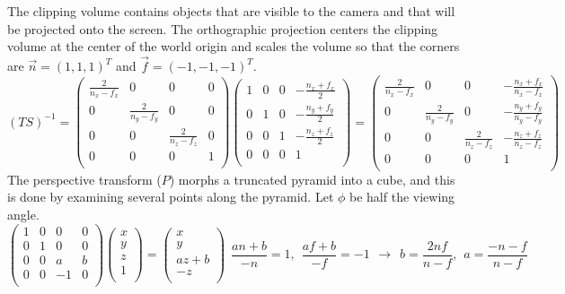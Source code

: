 \documentclass[10pt]{article}
\begin{document}
The clipping volume contains objects that are visible to the camera and that will be projected onto the screen. The orthographic projection centers the clipping volume at the center of the world origin and scales the volume so that the corners are $ \vec{n} = (1, 1, 1)^T $ and $ \vec{f} = (-1, -1, -1)^T $.
\[(TS)^{-1} = \begin{pmatrix}
\frac{2}{n_x-f_x} & 0 & 0 & 0 \\
0 & \frac{2}{n_y-f_y} & 0 & 0 \\
0 & 0 & \frac{2}{n_z-f_z} & 0 \\
0 & 0 & 0 & 1 \\
\end{pmatrix}
\begin{pmatrix}
1 & 0 & 0 & -\frac{n_x + f_x}{2} \\
0 & 1 & 0 & -\frac{n_y + f_y}{2} \\
0 & 0 & 1 & -\frac{n_z + f_z}{2} \\
0 & 0 & 0 & 1 \\
\end{pmatrix} =
\begin{pmatrix}
\frac{2}{n_x-f_x} & 0 & 0 & -\frac{n_x + f_x}{n_x-f_x} \\
0 & \frac{2}{n_y-f_y} & 0 & -\frac{n_y + f_y}{n_y-f_y} \\
0 & 0 & \frac{2}{n_z-f_z} & -\frac{n_z + f_z}{n_z-f_z} \\
0 & 0 & 0 & 1 \\
\end{pmatrix}\]
The perspective transform ($ P $) morphs a truncated pyramid into a cube, and this is done by examining several points along the pyramid. Let $\phi$ be half the viewing angle.
\[\begin{pmatrix}
1 & 0 & 0 & 0 \\
0 & 1 & 0 & 0 \\
0 & 0 & a & b \\
0 & 0 & -1 & 0 \\
\end{pmatrix}
\begin{pmatrix}
x \\
y \\
z \\
1 \\
\end{pmatrix} =
\begin{pmatrix}
x \\
y \\
az + b \\
-z \\
\end{pmatrix}
\hspace{5pt}
\frac{an + b}{-n} = 1, \hspace{5pt}
\frac{af + b}{-f} = -1
\hspace{5pt}\rightarrow\hspace{5pt}
b = \frac{2nf}{n-f}, \hspace{5pt}
a = \frac{-n-f}{n-f}\]
\end{document}
